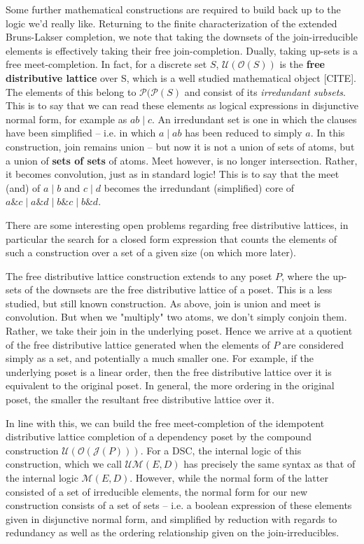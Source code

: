 \documentclass[hoptionsi,review,format=acmsmall]{acmart}
\theoremstyle{definition}
\newcommand{\Mcc}{\mathcal{M}}
\newcommand{\UMc}{\mathcal{UM}}
\newcommand{\Oc}{\mathcal{O}}
\newcommand{\Pc}{\mathcal{P}}
\newcommand{\Uc}{\mathcal{U}}
\newcommand{\Jc}{\mathcal{J}}
\newcommand{\band}{\mathbin{\&}}
\newcommand{\bor}{\mathbin{|}}
\begin{document}
Some further mathematical constructions are required to build back up to the logic we'd really like. Returning to the finite characterization of the extended Bruns-Lakser completion, we note that taking the downsets of the join-irreducible elements is effectively taking their free join-completion. Dually, taking up-sets is a free meet-completion. In fact, for a discrete set \(S\), \(\Uc(\Oc(S))\) is the \textbf{free distributive lattice} over S, which is a well studied mathematical object [CITE]. The elements of this belong to \(\Pc(\Pc(S)\) and consist of its \textit{irredundant subsets}. This is to say that we can read these elements as logical expressions in disjunctive normal form, for example as \(ab \bor c\). An irredundant set is one in which the clauses have been simplified -- i.e. in which \(a \bor ab\) has been reduced to simply \(a\).  In this construction, join remains union -- but now it is not a union of sets of atoms, but a union of \textbf{sets of sets} of atoms. Meet however, is no longer intersection. Rather, it becomes convolution, just as in standard logic! This is to say that the meet (and) of \(a \bor b\) and \(c \bor d\) becomes the irredundant (simplified) core of \(a \band c \bor a \band d \bor b \band c \bor b \band d\).

There are some interesting open problems regarding free distributive lattices, in particular the search for a closed form expression that counts the elements of such a construction over a set of a given size (on which more later).

The free distributive lattice construction extends to any poset \(P\), where the up-sets of the downsets are the free distributive lattice of a poset. This is a less studied, but still known construction. As above, join is union and meet is convolution. But when we "multiply" two atoms, we don't simply conjoin them. Rather, we take their join in the underlying poset. Hence we arrive at a quotient of the free distributive lattice generated when the elements of \(P\) are considered simply as a set, and potentially a much smaller one. For example, if the underlying poset is a linear order, then the free distributive lattice over it is equivalent to the original poset. In general, the more ordering in the original poset, the smaller the resultant free distributive lattice over it.

 In line with this, we can build the free meet-completion of the idempotent distributive lattice completion of a dependency poset by the compound construction \(\Uc(\Oc(\Jc(P)))\). For a DSC, the internal logic of this construction, which we call \(\UMc(E,D)\) has precisely the same syntax as that of the internal logic \(\Mcc(E,D)\). However, while the normal form of the latter consisted of a set of irreducible elements, the normal form for our new construction consists of a set of sets -- i.e. a boolean expression of these elements given in disjunctive normal form, and simplified by reduction with regards to redundancy as well as the ordering relationship given on the join-irreducibles.
 
\end{document}
